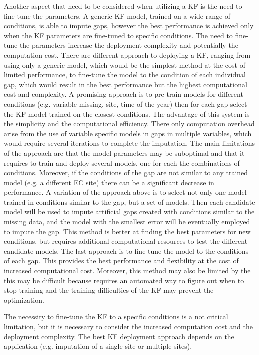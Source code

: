 \documentclass{article}
\begin{document}
Another aspect that need to be considered when utilizing a KF is the need to fine-tune the parameters. A generic KF model, trained on a wide range of conditions, is able to impute gaps, however the best performance is achieved only when the KF parameters are fine-tuned to specific conditions. The need to fine-tune the parameters increase the deployment complexity and potentially the computation cost. There are different approach to deploying a KF, ranging from using only a generic model, which would be the simplest method at the cost of limited performance, to fine-tune the model to the condition of each individual gap, which would result in the best performance but the highest computational cost and complexity. 
A promising approach is to pre-train models for different conditions (e.g. variable missing, site, time of the year) then for each gap select the KF model trained on the closest conditions. The advantage of this system is the simplicity and the computational efficiency. There  only computation overhead arise from the use of variable specific models in gaps in multiple variables, which would require several iterations to complete the imputation. The main limitations of the approach are that the model parameters may be suboptimal and that it requires to train and deploy several models, one for each the combinations of conditions. Moreover, if the conditions of the gap are not similar to any trained model (e.g. a different EC site) there can be a significant decrease in performance. 
A variation of the approach above is to select not only one model trained in conditions similar to the gap, but a set of models. Then each candidate model will be used to impute artificial gaps created with conditions similar to the missing data, and the model with the smallest error will be eventually employed to impute the gap. This method is better at finding the best parameters for new conditions, but requires additional computational resources to test the different candidate models.
The last approach is to fine tune the model to the conditions of each gap. This provides the best performance and flexibility at the cost of increased computational cost. Moreover, this method may also be limited by the  this may be difficult because requires an automated way to figure out when to stop training and the training difficulties of the KF may prevent the optimization.

The necessity to fine-tune the KF to a specific conditions is a not critical limitation, but it is necessary to consider the increased computation cost and the deployment complexity. The best KF deployment approach depends on the application (e.g. imputation of a single site or multiple sites).
\end{document}
